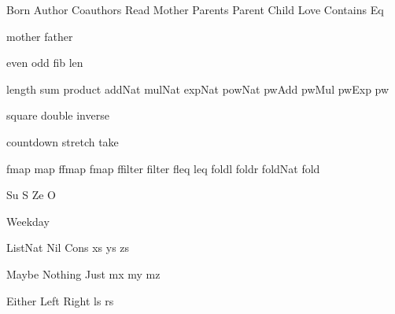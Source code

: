 
\DefRel Born
\DefRel Author
\DefRel Coauthors
\DefRel Read
\DefRel Mother
\DefRel Parents
\DefRel Parent
\DefRel Child
\DefRel Love
\DefRel Contains
\DefRel Eq

\DefFun mother
\DefFun father

\DefFun even
\DefFun odd
\DefFun fib
\DefFun len

\DefFpf length
\DefFpf sum
\DefFpf product
\DefFpf addNat
\DefFpf mulNat
\DefFpf expNat
\DefFpf powNat
\DefFpf pwAdd
\DefFpf pwMul
\DefFpf pwExp
\DefFpf pw

\DefFpf square
\DefFpf double
\DefFpf inverse

\DefFpf countdown
\DefFpf stretch
\DefFpf take

\DefFPF fmap    map
\DefFPF ffmap   fmap
\DefFPF ffilter filter
\DefFPF fleq    leq
\DefFpf foldl
\DefFpf foldr
\DefFpf foldNat
\DefFpf fold

\DefCONS Su S
\DefCONS Ze O

\DefType Weekday

\DefType ListNat
\DefCons Nil
\DefCons Cons
\DefVar xs
\DefVar ys
\DefVar zs

\DefType Maybe
\DefCons Nothing
\DefCons Just
\DefVar mx
\DefVar my
\DefVar mz

\DefType Either
\DefCons Left
\DefCons Right
\DefVar  ls
\DefVar  rs

\def\bla{\mathrm{bla}}
\def\blu{\mathrm{blu}}

\def\persons{{\cal P}}
\let\pers=\persons

\def\euclid{\algorithmstylize{Euclid}}%

\def\Smile{\rel{\woohoo}}
\def\Frown{\rel{\boohoo}}

\def\oddAs#1{A_{[#1]}}

